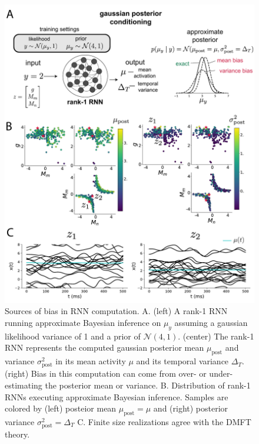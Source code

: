 \documentclass[11pt]{article}
\begin{document}
\begin{figure}
\begin{center}
\includegraphics[scale=0.7]{figures/fig5/fig5.pdf}
\end{center}
\caption{Sources of bias in RNN computation.  A. (left) A rank-1 RNN running approximate Bayesian inference on $\mu_y$ assuming a gaussian likelihood variance of 1 and a prior of $\mathcal{N}(4,1)$.  (center) The rank-1 RNN represents the computed gaussian posterior mean $\mu_{\text{post}}$ and variance $\sigma^2_{\text{post}}$  in its mean activity $\mu$ and its temporal variance $\Delta_T$.  (right) Bias in this computation can come from over- or under-estimating the posterior mean or variance. B. Distribution of rank-1 RNNs executing approximate Bayesian inference.  Samples are colored by (left) posteior mean $\mu_{\text{post}}=\mu$ and (right) posterior variance $\sigma^2_{\text{post}}=\Delta_T$  C. Finite size realizations agree with the DMFT theory.}
\end{figure}
\end{document}
